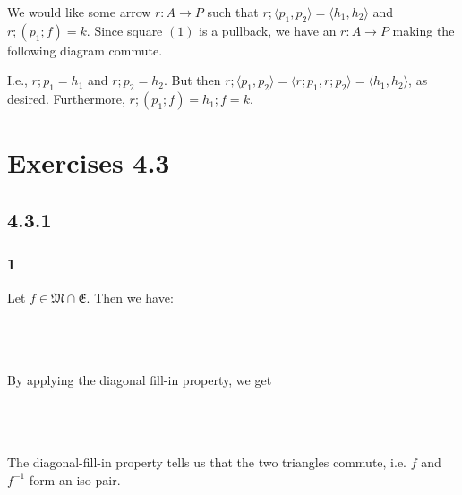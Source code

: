 \documentclass{article}
\begin{document}
We would like some arrow $r : A \to P$ such that $r;\langle p_1, p_2 \rangle = \langle h_1, h_2 \rangle$ and $r;(p_1;f) = k$.
Since square $(1)$ is a pullback, we have an $r : A \to P$ making the following diagram commute.

\begin{center}
\end{center}

I.e., $r;p_1 = h_1$ and $r;p_2 = h_2$. But then $r;\langle p_1, p_2 \rangle = \langle r;p_1, r;p_2 \rangle = \langle h_1, h_2 \rangle$, as desired. Furthermore, $r;(p_1;f) = h_1;f = k$.

\section*{Exercises 4.3}

\subsection*{4.3.1}

\subsubsection*{1}

Let $f \in \mathfrak M \cap \mathfrak E$. Then we have:\\~\\
\\~\\
By applying the diagonal fill-in property, we get\\~\\
\\~\\
The diagonal-fill-in property tells us that the two triangles commute, i.e. $f$ and $f^{-1}$ form
an iso pair.
\end{document}
